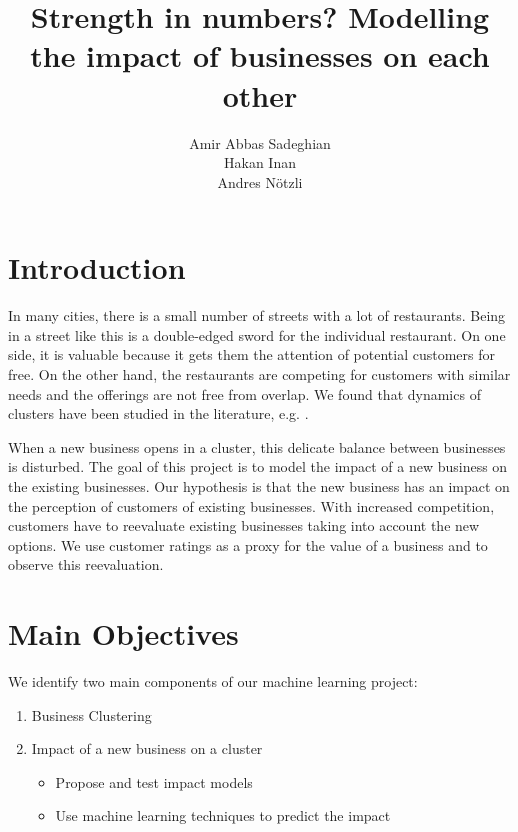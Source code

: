 \documentclass{vldb}
\begin{document}
\title{Strength in numbers? Modelling the impact of businesses on each other}


\author{
\alignauthor
Amir Abbas Sadeghian\\
\alignauthor
Hakan Inan\\
\alignauthor 
Andres N\"otzli\\
}

\maketitle

\section{Introduction}
In many cities, there is a small number of streets with a lot of restaurants.
Being in a street like this is a double-edged sword for the individual restaurant.
On one side, it is valuable because it gets them the attention of potential customers for free.
On the other hand, the restaurants are competing for customers with similar needs and the offerings are not free from overlap.
We found that dynamics of clusters have been studied in the literature, e.g. \cite{mccann2002industrial, porter1998clusters, schmitz1999global}.

When a new business opens in a cluster, this delicate balance between businesses is disturbed.
The goal of this project is to model the impact of a new business on the existing businesses.
Our hypothesis is that the new business has an impact on the perception of customers of existing businesses.
With increased competition, customers have to reevaluate existing businesses taking into account the new options.
We use customer ratings as a proxy for the value of a business and to observe this reevaluation.

\section*{Main Objectives}
We identify two main components of our machine learning project:
\begin{enumerate}
\item Business Clustering
\item Impact of a new business on a cluster
	\begin{itemize}
 	 \item Propose and test impact models
 	 \item Use machine learning techniques to predict the impact
  	\end{itemize}
	
\end{enumerate}
\end{document}
